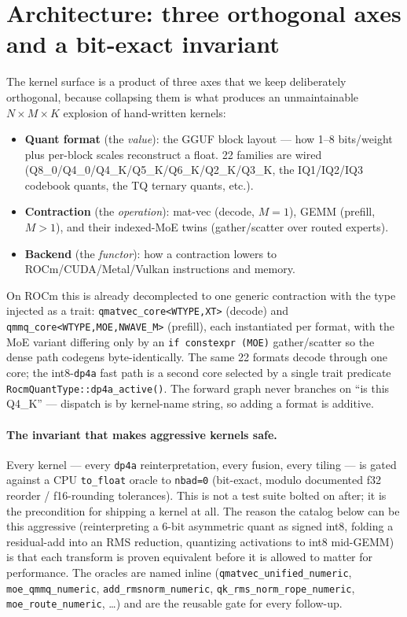 \documentclass[11pt]{article}
\newcommand{\dpa}{\texttt{dp4a}}
\begin{document}
\section{Architecture: three orthogonal axes and a bit-exact invariant}
\label{sec:arch}
The kernel surface is a product of three axes that we keep deliberately orthogonal, because
collapsing them is what produces an unmaintainable $N\times M\times K$ explosion of hand-written
kernels:
\begin{itemize}[noitemsep]
  \item \textbf{Quant format} (the \emph{value}): the GGUF block layout --- how 1--8 bits/weight
        plus per-block scales reconstruct a float. 22 families are wired
        (Q8\_0/Q4\_0/Q4\_K/Q5\_K/Q6\_K/Q2\_K/Q3\_K, the IQ1/IQ2/IQ3 codebook quants, the TQ
        ternary quants, etc.).
  \item \textbf{Contraction} (the \emph{operation}): mat-vec (decode, $M{=}1$), GEMM (prefill,
        $M{>}1$), and their indexed-MoE twins (gather/scatter over routed experts).
  \item \textbf{Backend} (the \emph{functor}): how a contraction lowers to ROCm/CUDA/Metal/Vulkan
        instructions and memory.
\end{itemize}
On ROCm this is already decomplected to one generic contraction with the type injected as a
trait: \texttt{qmatvec\_core<WTYPE,XT>} (decode) and \texttt{qmmq\_core<WTYPE,MOE,NWAVE\_M>}
(prefill), each instantiated per format, with the MoE variant differing only by an
\texttt{if constexpr (MOE)} gather/scatter so the dense path codegens byte-identically. The same
22 formats decode through one core; the int8-\dpa{} fast path is a second core selected by a single
trait predicate \texttt{RocmQuantType::dp4a\_active()}. The forward graph never branches on
``is this Q4\_K'' --- dispatch is by kernel-name string, so adding a format is additive.

\paragraph{The invariant that makes aggressive kernels safe.} Every kernel --- every \dpa{}
reinterpretation, every fusion, every tiling --- is gated against a CPU \texttt{to\_float} oracle
to \texttt{nbad=0} (bit-exact, modulo documented f32 reorder / f16-rounding tolerances). This is
not a test suite bolted on after; it is the precondition for shipping a kernel at all. The reason
the catalog below can be this aggressive (reinterpreting a 6-bit asymmetric quant as signed int8,
folding a residual-add into an RMS reduction, quantizing activations to int8 mid-GEMM) is that
each transform is proven equivalent before it is allowed to matter for performance. The oracles
are named inline (\texttt{qmatvec\_unified\_numeric}, \texttt{moe\_qmmq\_numeric},
\texttt{add\_rmsnorm\_numeric}, \texttt{qk\_rms\_norm\_rope\_numeric}, \texttt{moe\_route\_numeric},
\dots) and are the reusable gate for every follow-up.
\end{document}

